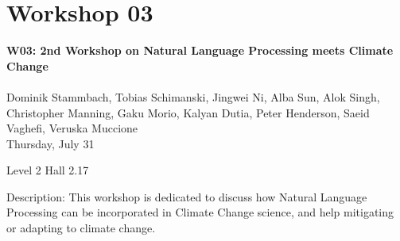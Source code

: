 \clearpage



\section[W03: 2nd Workshop on Natural Language Processing meets Climate Change]{Workshop 03}
\label{workshop_3}

\begin{center}
    {\Large \textbf{W03: 2nd Workshop on Natural Language Processing meets Climate Change}}\\
\\

    Dominik Stammbach, Tobias Schimanski, Jingwei Ni, Alba Sun, Alok Singh, Christopher Manning, Gaku Morio, Kalyan Dutia, Peter Henderson, Saeid Vaghefi, Veruska Muccione\\

    Thursday, July 31
    
    Level 2 Hall 2.17

\end{center}

Description: This workshop is dedicated to discuss how Natural Language Processing can be incorporated in Climate Change science, and help mitigating or adapting to climate change.


